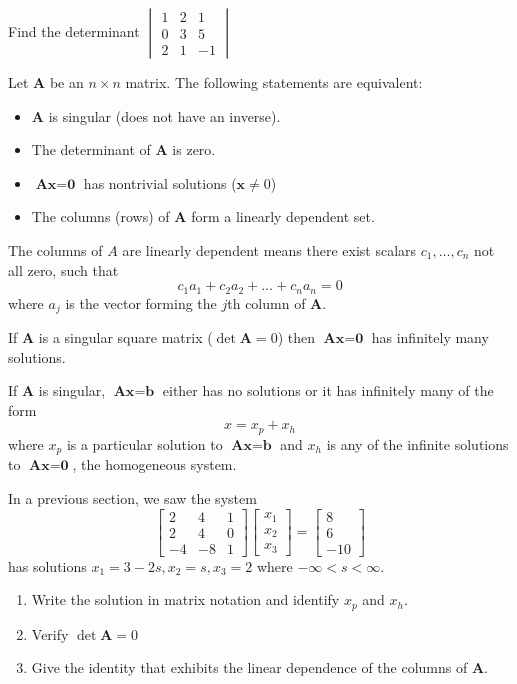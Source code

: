 \documentclass[../diffeq.tex]{subfiles}
\begin{document}
\ex Find the determinant $\begin{vmatrix}
    1 & 2 & 1\\
    0 & 3 & 5\\
    2 & 1 & -1
\end{vmatrix}$

\begin{theorem}
    Let $\textbf{A}$ be an $n\times n$ matrix. The following statements are equivalent:
\begin{itemize}
    \item $\textbf{A}$ is singular (does not have an inverse).
    \item The determinant of $\textbf{A}$ is zero.
    \item $\textbf{Ax}=\textbf{0}$ has nontrivial solutions ($\textbf{x}\neq 0$)
    \item The columns (rows) of $\textbf{A}$ form a linearly dependent set.
\end{itemize} 
\end{theorem}



The columns of $A$ are linearly dependent means there exist scalars $c_1,\dots, c_n$ not all zero, such that 
\[ c_1a_1+c_2a_2+\dots + c_na_n = 0\]
where $a_j$ is the vector forming the $j$th column of $\textbf{A}$.

If $\textbf{A}$ is a singular square matrix ($\det \textbf{A}=0$) then $\textbf{Ax}=\textbf{0}$ has infinitely many solutions.

If $\textbf{A}$ is singular, $\textbf{Ax}=\textbf{b}$ either has no solutions or it has infinitely many of the form 
\[ x=x_p+x_h\]
where $x_p$ is a particular solution to $\textbf{Ax}=\textbf{b}$ and $x_h$ is any of the infinite solutions to $\textbf{Ax}=\textbf{0}$, the homogeneous system.

\ex In a previous section, we saw the system 
\[ \begin{bmatrix}
    2 & 4 & 1\\
    2 &4 & 0\\
    -4 & -8 & 1
\end{bmatrix}\begin{bmatrix}
    x_1\\x_2\\x_3
\end{bmatrix}=\begin{bmatrix}
    8\\6\\-10
\end{bmatrix}\]
has solutions $x_1=3-2s,x_2=s,x_3=2$ where $-\infty<s<\infty$.
\begin{enumerate}
    \item Write the solution in matrix notation and identify $x_p$ and $x_h$.
    \item Verify $\det \textbf{A}=0$
    \item Give the identity that exhibits the linear dependence of the columns of $\textbf{A}$.
\end{enumerate}
\end{document}
